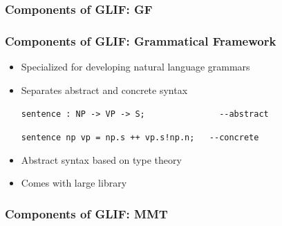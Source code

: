 \begin{frame}
    \frametitle{Components of GLIF: GF}
    
\end{frame}

\begin{frame}[fragile]
    \frametitle{Components of GLIF: Grammatical Framework \cite{GF:on}}
    \begin{itemize}
        \item Specialized for developing natural language grammars
        \item Separates abstract and concrete syntax\par
            \quad\lstinline[language=GF]|sentence : NP -> VP -> S;               --abstract|\par
            \quad\lstinline[language=GF]|sentence np vp = np.s ++ vp.s!np.n;   --concrete|
        \item Abstract syntax based on type theory
        \item Comes with large library 
    \end{itemize}

    \vspace{2em}
    \hspace{2.5em}
\end{frame}

\begin{frame}
    \frametitle{Components of GLIF: MMT}
    
\end{frame}

